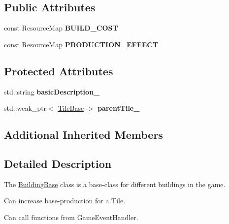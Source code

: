 \subsection*{Public Attributes}
\begin{DoxyCompactItemize}
\item 
\hypertarget{class_course_1_1_building_base_ab63e067ebb226173d7b281c70b6e58bf}{const Resource\-Map {\bfseries B\-U\-I\-L\-D\-\_\-\-C\-O\-S\-T}}\label{class_course_1_1_building_base_ab63e067ebb226173d7b281c70b6e58bf}

\item 
\hypertarget{class_course_1_1_building_base_a69fc58a02c5299f408f35ef02a604633}{const Resource\-Map {\bfseries P\-R\-O\-D\-U\-C\-T\-I\-O\-N\-\_\-\-E\-F\-F\-E\-C\-T}}\label{class_course_1_1_building_base_a69fc58a02c5299f408f35ef02a604633}

\end{DoxyCompactItemize}
\subsection*{Protected Attributes}
\begin{DoxyCompactItemize}
\item 
\hypertarget{class_course_1_1_building_base_ac508861ea41128f6eddbf2f1ff90ee20}{std\-::string {\bfseries basic\-Description\-\_\-}}\label{class_course_1_1_building_base_ac508861ea41128f6eddbf2f1ff90ee20}

\item 
\hypertarget{class_course_1_1_building_base_a31efce98798682e7b333fd4e46e742c3}{std\-::weak\-\_\-ptr$<$ \hyperlink{class_course_1_1_tile_base}{Tile\-Base} $>$ {\bfseries parent\-Tile\-\_\-}}\label{class_course_1_1_building_base_a31efce98798682e7b333fd4e46e742c3}

\end{DoxyCompactItemize}
\subsection*{Additional Inherited Members}


\subsection{Detailed Description}
The \hyperlink{class_course_1_1_building_base}{Building\-Base} class is a base-\/class for different buildings in the game. 


\begin{DoxyItemize}
\item Can increase base-\/production for a Tile.
\item Can call functions from Game\-Event\-Handler.
\end{DoxyItemize}

